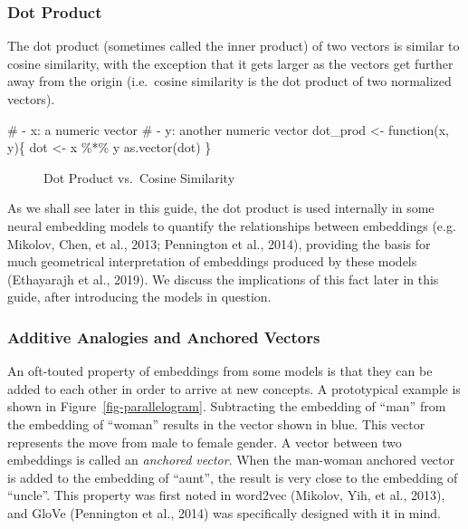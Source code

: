 \documentclass[
  man,
  floatsintext,
  longtable,
  nolmodern,
  notxfonts,
  notimes,
  colorlinks=true,linkcolor=blue,citecolor=blue,urlcolor=blue]{apa7}
\newenvironment{Shaded}{\begin{snugshade}}{\end{snugshade}}
\newcommand{\CommentTok}[1]{\textcolor[rgb]{0.37,0.37,0.37}{#1}}
\newcommand{\ControlFlowTok}[1]{\textcolor[rgb]{0.00,0.23,0.31}{#1}}
\newcommand{\FunctionTok}[1]{\textcolor[rgb]{0.28,0.35,0.67}{#1}}
\newcommand{\NormalTok}[1]{\textcolor[rgb]{0.00,0.23,0.31}{#1}}
\newcommand{\OtherTok}[1]{\textcolor[rgb]{0.00,0.23,0.31}{#1}}
\newcommand{\SpecialCharTok}[1]{\textcolor[rgb]{0.37,0.37,0.37}{#1}}
\begin{document}
\subsubsection{Dot Product}\label{dot-product}

The dot product (sometimes called the inner product) of two vectors is
similar to cosine similarity, with the exception that it gets larger as
the vectors get further away from the origin (i.e.~cosine similarity is
the dot product of two normalized vectors).

\begin{Shaded}
\begin{Highlighting}[]
\CommentTok{\#  {-} \textasciigrave{}x\textasciigrave{}: a numeric vector}
\CommentTok{\#  {-} \textasciigrave{}y\textasciigrave{}: another numeric vector}
\NormalTok{dot\_prod }\OtherTok{\textless{}{-}} \ControlFlowTok{function}\NormalTok{(x, y)\{}
\NormalTok{  dot }\OtherTok{\textless{}{-}}\NormalTok{ x }\SpecialCharTok{\%*\%}\NormalTok{ y}
  \FunctionTok{as.vector}\NormalTok{(dot)}
\NormalTok{\}}
\end{Highlighting}
\end{Shaded}

\begin{figure}

\caption{\label{fig-dotprod}Dot Product vs.~Cosine Similarity}


\end{figure}%

As we shall see later in this guide, the dot product is used internally
in some neural embedding models to quantify the relationships between
embeddings (e.g. Mikolov, Chen, et al., 2013; Pennington et al., 2014),
providing the basis for much geometrical interpretation of embeddings
produced by these models (Ethayarajh et al., 2019). We discuss the
implications of this fact later in this guide, after introducing the
models in question.

\subsubsection{Additive Analogies and Anchored
Vectors}\label{additive-analogies-and-anchored-vectors}

An oft-touted property of embeddings from some models is that they can
be added to each other in order to arrive at new concepts. A
prototypical example is shown in Figure~\ref{fig-parallelogram}.
Subtracting the embedding of ``man'' from the embedding of ``woman''
results in the vector shown in blue. This vector represents the move
from male to female gender. A vector between two embeddings is called an
\emph{anchored vector}. When the man-woman anchored vector is added to
the embedding of ``aunt'', the result is very close to the embedding of
``uncle''. This property was first noted in word2vec (Mikolov, Yih, et
al., 2013), and GloVe (Pennington et al., 2014) was specifically
designed with it in mind.
\end{document}
